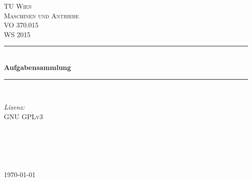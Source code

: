 

	
	
	\begin{titlepage}
		
		\newcommand{\HRule}{\rule{\linewidth}{0.5mm}} %
		
		\center %
		
		\textsc{\LARGE TU Wien}\\[1.5cm] %
		\textsc{\Large Maschinen und Antriebe}\\[0.5cm] %
		\textsc{\large VO 370.015 \\ WS 2015}\\[0.5cm] %
		
		\HRule \\[0.4cm]
		{ \huge \bfseries Aufgabensammlung}\\[0.4cm] %
		\HRule \\[1.5cm]
		
		\begin{minipage}{0.4\textwidth}
			\begin{flushleft} \large
				\emph{Lizenz:}\\
				GNU \textsc{GPLv3} %
			\end{flushleft}
		\end{minipage}
		~
		\begin{minipage}{0.4\textwidth}
			\begin{flushright} \large
				\emph{} \\
				\textsc{} %
			\end{flushright}
		\end{minipage}\\[4cm]
		
		{\large \today}\\[3cm] %
		
		
		\vfill %
		
	\end{titlepage}
	
